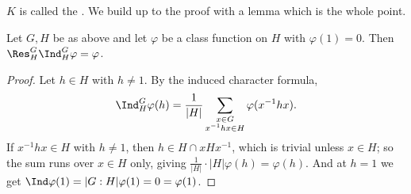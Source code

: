 $K$ is called the . We build up to the proof with a lemma which is the whole point.

\begin{lemma}
	Let $G, H$ be as above and let $\varphi$ be a class function on $H$ with $\varphi(1) = 0$. Then $\Res^G_H\Ind_H^G\varphi = \varphi$.
\end{lemma}
\begin{proof}
	Let $h \in H$ with $h\neq 1$. By the induced character formula,
	$$\Ind_H^G\varphi(h) = \frac1{|H|}\sum_{\substack{x\in G\\ x^{-1}hx\in H}}\varphi(x^{-1}hx).$$
	If $x^{-1}hx \in H$ with $h\neq 1$, then $h\in H\cap xHx^{-1}$, which is trivial unless $x\in H$; so the sum runs over $x\in H$ only, giving $\frac1{|H|}\cdot|H|\varphi(h) = \varphi(h)$. And at $h = 1$ we get $\Ind\varphi(1) = |G:H|\varphi(1) = 0 = \varphi(1)$.
\end{proof}

